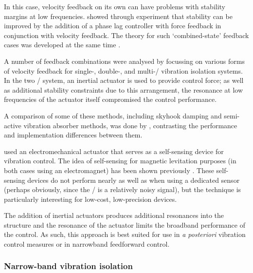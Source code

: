 \documentclass[11pt,a4paper]{memoir}
\begin{document}
In this case, velocity feedback on its own can have problems with stability margins at low frequencies.
\textcite{benassi2002-part2} showed through experiment that stability can be improved by the addition of a phase lag controller with force feedback in conjunction with velocity feedback.
The theory for such `combined-state' feedback cases was developed at the same time \cite{benassi2002-double}.

A number of feedback combinations were analysed by \textcite{diaz2005} focussing on various forms of velocity feedback for \mbox{single-,} \mbox{double-,} and multi-\dof/ vibration isolation systems.
In the two \dof/ system, an inertial actuator is used to provide control force; as well as additional stability constraints due to this arrangement, the resonance at low frequencies of the actuator itself compromised the control performance.

A comparison of some of these methods, including skyhook damping and semi-active vibration absorber methods, was done by \textcite{huyanan2007}, contrasting the performance and implementation differences between them.

\textcite{paulitsch2003} used an electromechanical actuator that serves as a self-sensing device for vibration control.
The idea of self-sensing for magnetic levitation purposes (in both cases using an electromagnet) has been shown previously \cite{bleuler1992,vischer1993}.
These self-sensing devices do not perform nearly as well as when using a dedicated sensor (perhaps obviously, since the \backemf/ is a relatively noisy signal), but the technique is particularly interesting for low-cost, low-precision devices.

The addition of inertial actuators produces additional resonances into the structure and the resonance of the actuator limits the broadband performance of the control. As such, this approach is best suited for use in \emph{a posteriori} vibration control measures or in narrowband feedforward control.

\subsubsection{Narrow-band vibration isolation}
\end{document}
